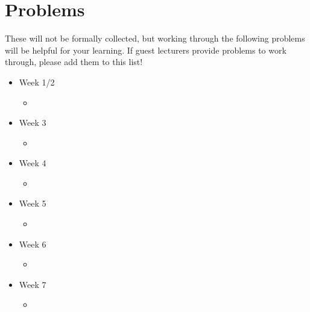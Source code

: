 \documentclass{article}
\begin{document}
\section*{Problems}

These will not be formally collected, but working through the following problems
will be helpful for your learning.  If guest lecturers provide problems to work
through, please add them to this list!

\begin{itemize}
    \item Week 1/2
        \begin{itemize}
            \item \todo{}
        \end{itemize}
    \item Week 3
        \begin{itemize}
            \item \todo{}
        \end{itemize}
    \item Week 4
        \begin{itemize}
            \item \todo{}
        \end{itemize}
    \item Week 5
        \begin{itemize}
            \item \todo{}
        \end{itemize}
    \item Week 6
        \begin{itemize}
            \item \todo{}
        \end{itemize}
    \item Week 7
        \begin{itemize}
            \item \todo{}
        \end{itemize}
\end{itemize}
\end{document}

